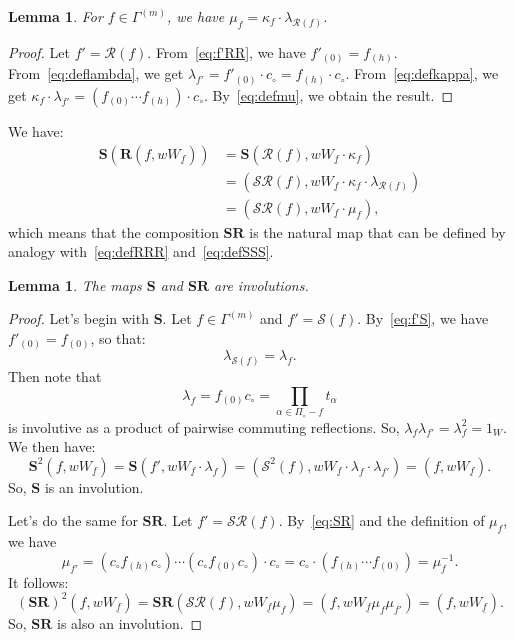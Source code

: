 \documentclass[11pt]{article}
\newtheorem{lemm}[theo]{Lemma}
\theoremstyle{definition}
\newcommand{\RR}{\mathcal{R}}
\renewcommand{\SS}{\mathcal{S}}
\newcommand{\RRR}{\mathbf{R}}
\newcommand{\SSS}{\mathbf{S}}
\begin{document}
\begin{lemm}
    For $f \in \Gamma^{(m)}$, we have $\mu_f = \kappa_f \cdot \lambda_{\RR(f)}$.
\end{lemm}

\begin{proof}
    Let $f' = \RR(f)$. From~\eqref{eq:f'RR}, we have $f'_{(0)} = f_{(h)}$. From~\eqref{eq:deflambda}, we get $\lambda_{f'} = f'_{(0)} \cdot c_\circ = f_{(h)} \cdot c_\circ$. From~\eqref{eq:defkappa}, we get $ \kappa_f \cdot \lambda_{f'} = (f_{(0)} \cdots f_{(h)} ) \cdot c_\circ$.  By~\eqref{eq:defmu}, we obtain the result.
\end{proof}

We have:
\begin{align*}
    \SSS(\RRR(f,wW_{\underline{f}}))
    &=
    \SSS( \RR(f) , wW_{\underline{f}}\cdot \kappa_f ) \\
    &=
    ( \SS\RR(f) , wW_{\underline{f}}\cdot \kappa_f \cdot \lambda_{\RR(f)}) \\
    &=
    ( \SS\RR(f) , wW_{\underline{f}}\cdot \mu_f ),
\end{align*}
which means that the composition $\SSS\RRR$ is the natural map that can be defined by analogy with~\eqref{eq:defRRR} and~\eqref{eq:defSSS}.

\begin{lemm}
    The maps $\SSS$ and $\SSS\RRR$ are involutions.
\end{lemm}

\begin{proof}
    Let's begin with $\SSS$.  Let $f\in\Gamma^{(m)}$ and $f' = \SS(f)$.  By~\eqref{eq:f'S}, we have $f'_{(0)} = f_{(0)}$, so that:
    \[
        \lambda_{\SS(f)} = \lambda_{f}.
    \]
    Then note that
    \[
        \lambda_{f} = f_{(0)} c_\circ = \prod_{\alpha \in \varPi_\circ - f} t_\alpha
    \]
    is involutive as a product of pairwise commuting reflections.  So, $\lambda_{f} \lambda_{f'} = \lambda_f^2 = 1_W$.  We then have:
    \[
        \SSS^2( f , w W_{\underline{f}} )
        =
        \SSS( f' , w W_{\underline{f}} \cdot \lambda_f )
        =
        ( \SS^2(f) , w W_{\underline{f}} \cdot \lambda_f \cdot \lambda_{f'} )
        =
        ( f , w W_{\underline{f}} ).
    \]
    So, $\SSS$ is an involution.

    Let's do the same for $\SSS\RRR$.  Let $f' = \SS\RR(f)$.  By~\eqref{eq:SR} and the definition of $\mu_f$, we have
    \[
        \mu_{f'} = (c_\circ f_{(h)}c_\circ) \cdots (c_\circ f_{(0)}c_\circ) \cdot c_\circ
        =
        c_\circ \cdot ( f_{(h)} \cdots f_{(0)} ) = \mu_f^{-1}.
    \]
    It follows:
    \[
        (\SSS\RRR)^2(f,w W_{\underline{f}})
        =
        \SSS\RRR( \SS\RR(f) , w W_{\underline{f}} \mu_f)
        =
        ( f , w W_{\underline{f}} \mu_f \mu_{f'})
        =
        ( f , w W_{\underline{f}}).
    \]
    So, $\SSS\RRR$ is also an involution.
\end{proof}
\end{document}
